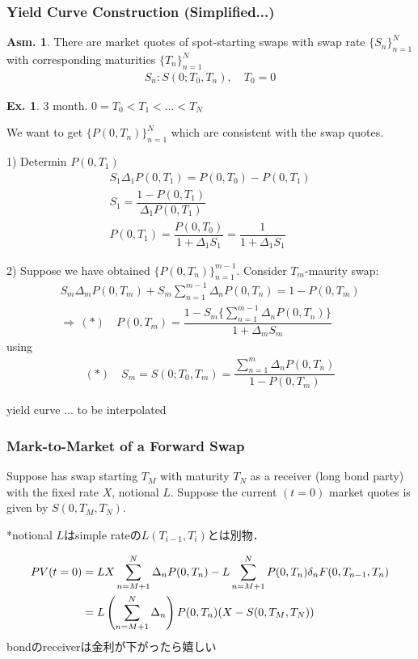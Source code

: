 \documentclass[a4paper,11pt]{jsarticle}
\theoremstyle{definition}
\newtheorem{ex}{Ex.}[subsection]
\newtheorem{asm}{Asm.}[subsection]
\newcommand{\df}[2]{\dfrac{#1}{#2}}
\begin{document}
\subsubsection{Yield Curve Construction (Simplified...)}
\begin{asm}
  There are market quotes of spot-starting swaps with swap rate
  $\{S_n\}_{n=1}^N$ with corresponding maturities $\{T_n\}_{n=1}^N$
  \begin{align}
    S_n:S(0;T_0,T_n), \quad T_0=0
  \end{align}
\end{asm}


\begin{ex}
  3 month. $0=T_0<T_1<...<T_N$
\end{ex}
We want to get $\{P(0,T_n)\}_{n=1}^N$ which are consistent with
the swap quotes.

1) Determin $P(0,T_1)$
\begin{align}
  S_1 \Delta_1 P(0,T_1)=P(0,T_0)-P(0,T_1) \\
  S_1 = \df{1-P(0,T_1)}{\Delta_1 P(0,T_1)} \\
  P(0,T_1)=\df{P(0,T_0)}{1+\Delta_1 S_1}=\df{1}{1+\Delta_1 S_1}
\end{align}

2) Suppose we have obtained $\{P(0,T_n)\}_{n=1}^{m-1}$.
Consider $T_m$-maurity swap:
\begin{align}
  S_m \Delta_m P(0,T_m)+S_m \sum_{n=1}^{m-1} \Delta_n P(0,T_n)
  =1-P(0,T_m) \\
  \Rightarrow \, (*) \quad
  P(0,T_m)=\df{1-S_m\{\sum_{n=1}^{m-1}\Delta_n P(0,T_n)\}}
  {1+\Delta_m S_m}
\end{align}
using
\begin{align}
  (*) \quad S_m=S(0;T_0,T_m)
  =\df{\sum_{n=1}^{m}\Delta_n P(0,T_n)}{1-P(0,T_m)}
\end{align}

yield curve ... to be interpolated


\subsubsection{Mark-to-Market of a Forward Swap}
Suppose has swap starting $T_M$ with maturity $T_N$
as a receiver (long bond party) with the fixed rate $X$,
notional $L$.
Suppose the current $(t=0)$ market quotes is given by
$S(0,T_M,T_N)$.

*notional $L$はsimple rateの$L(T_{i-1},T_i)$とは別物．

\begin{align}
  PV(t=0) &= LX\sum_{n=M+1}^N \Delta_n P(0,T_n)
  -L\sum_{n=M+1}^{N}P(0,T_n)\delta_n F(0,T_{n-1},T_n)
  \notag\\
  &=L\left(\sum_{n=M+1}^{N}\Delta_n \right)
  P(0,T_n)(X-S(0,T_M,T_N))
\end{align}
bondのreceiverは金利が下がったら嬉しい
\end{document}
